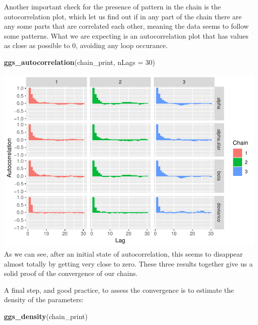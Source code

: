 \documentclass[]{article}
\newenvironment{Shaded}{\begin{snugshade}}{\end{snugshade}}
\newcommand{\DataTypeTok}[1]{\textcolor[rgb]{0.13,0.29,0.53}{#1}}
\newcommand{\DecValTok}[1]{\textcolor[rgb]{0.00,0.00,0.81}{#1}}
\newcommand{\KeywordTok}[1]{\textcolor[rgb]{0.13,0.29,0.53}{\textbf{#1}}}
\newcommand{\NormalTok}[1]{#1}
\begin{document}
Another important check for the presence of pattern in the chain is the
autocorrelation plot, which let us find out if in any part of the chain
there are any some parts that are correlated each other, meaning the
data seems to follow some patterns. What we are expecting is an
autocorrelation plot that has values as close as possible to 0, avoiding
any loop occurance.

\begin{Shaded}
\begin{Highlighting}[]
\KeywordTok{ggs_autocorrelation}\NormalTok{(chain_print, }\DataTypeTok{nLags =} \DecValTok{30}\NormalTok{)}
\end{Highlighting}
\end{Shaded}

\includegraphics{FinalProject-SDSII_files/figure-latex/unnamed-chunk-11-1.pdf}
As we can see, after an initial state of autocorrelation, this seems to
disappear almost totally by getting very close to zero. These three
results together give us a solid proof of the convergence of our chains.

A final step, and good practice, to assess the convergence is to
estimate the density of the parameters:

\begin{Shaded}
\begin{Highlighting}[]
\KeywordTok{ggs_density}\NormalTok{(chain_print)}
\end{Highlighting}
\end{Shaded}
\end{document}
